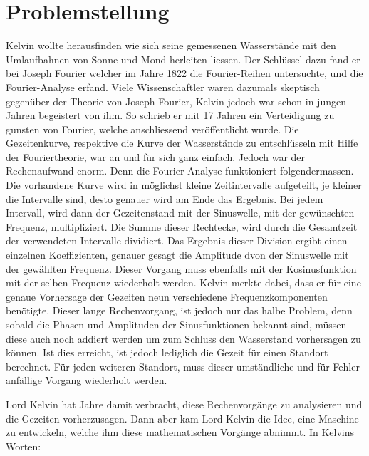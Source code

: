 %
%
%
%
\section{Problemstellung
\label{gezeiten:section:teil1}}
Kelvin wollte herausfinden wie sich seine gemessenen Wasserstände mit den Umlaufbahnen von Sonne und Mond herleiten liessen.
Der Schlüssel dazu fand er bei Joseph Fourier welcher im Jahre 1822 die Fourier-Reihen untersuchte, und die Fourier-Analyse erfand.
Viele Wissenschaftler waren dazumals skeptisch gegenüber der Theorie von Joseph Fourier, Kelvin jedoch war schon in jungen Jahren begeistert von ihm.
So schrieb er mit 17 Jahren ein Verteidigung zu gunsten von Fourier, welche anschliessend veröffentlicht wurde.
Die Gezeitenkurve, respektive die Kurve der Wasserstände zu entschlüsseln mit Hilfe der Fouriertheorie, war an und für sich ganz einfach.
Jedoch war der Rechenaufwand enorm.
Denn die Fourier-Analyse funktioniert folgendermassen.
Die vorhandene Kurve wird in möglichst kleine Zeitintervalle aufgeteilt, je kleiner die Intervalle sind, desto genauer wird am Ende das Ergebnis.
Bei jedem Intervall, wird dann der Gezeitenstand mit der Sinuswelle, mit der gewünschten Frequenz, multipliziert.
Die Summe dieser Rechtecke, wird durch die Gesamtzeit der verwendeten Intervalle dividiert.
Das Ergebnis dieser Division ergibt einen einzelnen Koeffizienten, genauer gesagt die Amplitude dvon der Sinuswelle mit der gewählten Frequenz.
Dieser Vorgang muss ebenfalls mit der Kosinusfunktion mit der selben Frequenz wiederholt werden.
Kelvin merkte dabei, dass er für eine genaue Vorhersage der Gezeiten neun verschiedene Frequenzkomponenten benötigte.
Dieser lange Rechenvorgang, ist jedoch nur das halbe Problem, denn sobald die Phasen und Amplituden der Sinusfunktionen bekannt sind, müssen diese auch noch addiert werden um zum Schluss den Wasserstand vorhersagen zu können.
Ist dies erreicht, ist jedoch lediglich die Gezeit für einen Standort berechnet.
Für jeden weiteren Standort, muss dieser umständliche und für Fehler anfällige Vorgang wiederholt werden.

Lord Kelvin hat Jahre damit verbracht, diese Rechenvorgänge zu analysieren und die Gezeiten vorherzusagen.
Dann aber kam Lord Kelvin die Idee, eine Maschine zu entwickeln, welche ihm diese mathematischen Vorgänge abnimmt. In Kelvins Worten: \grqq





